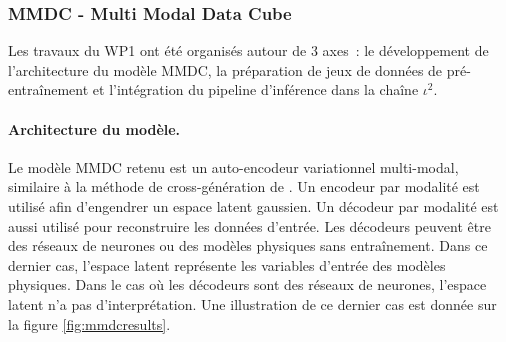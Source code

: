 \subsubsection{MMDC - Multi Modal Data Cube}
\label{subsec:mmdc}
Les travaux du WP1 ont été organisés autour de 3 axes : le développement de l’architecture du modèle MMDC, la préparation de jeux de données de pré-entraînement et l’intégration du pipeline d’inférence dans la chaîne $\iota^2$.

\paragraph{Architecture du modèle.}
Le modèle MMDC retenu est un auto-encodeur variationnel multi-modal, similaire à la méthode de cross-génération de \cite{shi-2019-variat-mixtur}. Un encodeur par modalité est utilisé afin d’engendrer un espace latent gaussien. Un décodeur par modalité est aussi utilisé pour reconstruire les données d’entrée. Les décodeurs peuvent être des réseaux de neurones ou des modèles physiques sans entraînement. Dans ce dernier cas, l’espace latent représente les variables d’entrée des modèles physiques. Dans le cas où les décodeurs sont des réseaux de neurones, l’espace latent n’a pas d’interprétation. Une illustration de ce dernier cas est donnée sur la figure \ref{fig:mmdcresults}.

